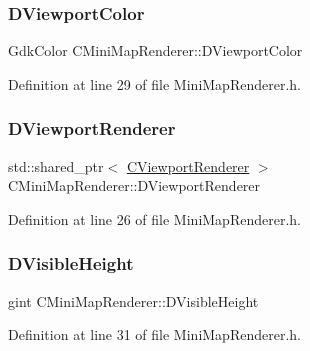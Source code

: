 \subsubsection{\texorpdfstring{D\+Viewport\+Color}{DViewportColor}}
{\footnotesize\ttfamily Gdk\+Color C\+Mini\+Map\+Renderer\+::\+D\+Viewport\+Color\hspace{0.3cm}{\ttfamily [protected]}}



Definition at line 29 of file Mini\+Map\+Renderer.\+h.

\hypertarget{classCMiniMapRenderer_a36d2e3446baba2607129c673311d3420}{}\label{classCMiniMapRenderer_a36d2e3446baba2607129c673311d3420} 
\subsubsection{\texorpdfstring{D\+Viewport\+Renderer}{DViewportRenderer}}
{\footnotesize\ttfamily std\+::shared\+\_\+ptr$<$ \hyperlink{classCViewportRenderer}{C\+Viewport\+Renderer} $>$ C\+Mini\+Map\+Renderer\+::\+D\+Viewport\+Renderer\hspace{0.3cm}{\ttfamily [protected]}}



Definition at line 26 of file Mini\+Map\+Renderer.\+h.

\hypertarget{classCMiniMapRenderer_aad56353e51a1a3da66d3428cf0f1ccf8}{}\label{classCMiniMapRenderer_aad56353e51a1a3da66d3428cf0f1ccf8} 
\subsubsection{\texorpdfstring{D\+Visible\+Height}{DVisibleHeight}}
{\footnotesize\ttfamily gint C\+Mini\+Map\+Renderer\+::\+D\+Visible\+Height\hspace{0.3cm}{\ttfamily [protected]}}



Definition at line 31 of file Mini\+Map\+Renderer.\+h.

\hypertarget{classCMiniMapRenderer_aedcb790a697e6f606cd7fa5089a41359}{}\label{classCMiniMapRenderer_aedcb790a697e6f606cd7fa5089a41359} 
